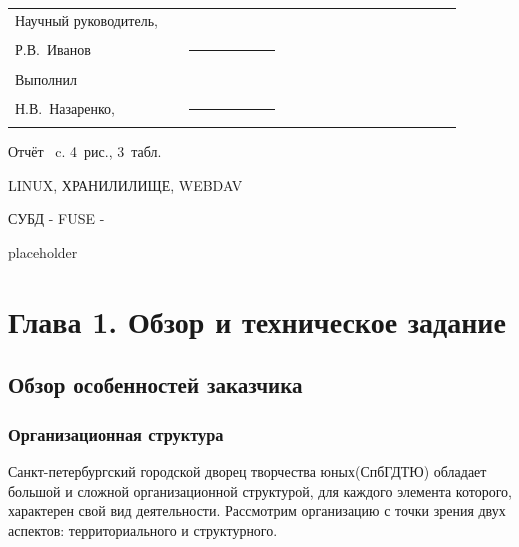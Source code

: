 \documentclass[utf8,usehyperref,12pt]{G7-32}
\begin{document}

\frontmatter %



\Executors %
\begin{longtable}{p{0.35\linewidth}p{0.2\linewidth}p{0.35\linewidth}}
Научный руководитель, 	&		&	\\
Р.В.~Иванов	&\rule{1\linewidth}{0.1pt}	&  \\ \vspace{1cm}

Выполнил  &		&	\\
Н.В.~Назаренко, & \rule{1\linewidth}{0.1pt}& \\
\end{longtable}

\Referat %
Отчёт \pageref{LastPage}~c. 4~рис., 3~табл.

\MakeUppercase{Linux, хранилилище, webdav}



\tableofcontents

\Defines %
СУБД -
FUSE -


\Introduction

placeholder

\mainmatter %

\chapter{Глава 1. Обзор и техническое задание}

\section{Обзор особенностей заказчика}
\subsection{Организационная структура}
Санкт-петербургский городской дворец творчества юных(СпбГДТЮ) обладает большой и сложной организационной структурой, для каждого 
элемента которого, характерен свой вид деятельности. Рассмотрим организацию с точки зрения двух аспектов: территориального
и структурного.
\end{document}
